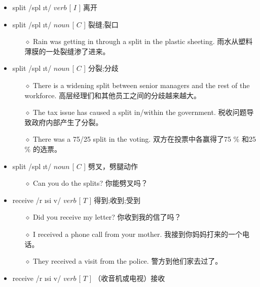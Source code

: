 \documentclass[a4paper,top=2.5cm,buttom=2.5cm10.5pt]{book}
\begin{document}
\begin{itemize}
\item split /spl \i t/ $ verb $ [  $ I $  ] 离开
\end{itemize}
\begin{itemize}
\item split /spl \i t/ $ noun $ [  $ C $  ] 裂缝;裂口
\begin{itemize}
\item[$\diamond$] Rain was getting in through a split in the plastic sheeting.
雨水从塑料薄膜的一处裂缝渗了进来。
\end{itemize}
\end{itemize}
\begin{itemize}
\item split /spl \i t/ $ noun $ [  $ C $  ] 分裂;分歧
\begin{itemize}
\item[$\diamond$] There is a widening split between senior managers and the rest of the workforce.
高层经理们和其他员工之间的分歧越来越大。
\item[$\diamond$] The tax issue has caused a split in/within the government.
税收问题导致政府内部产生了分裂。
\item[$\diamond$] There was a 75/25 split in the voting.
双方在投票中各赢得了75 $ \% $ 和25 $ \% $ 的选票。
\end{itemize}
\end{itemize}
\begin{itemize}
\item split /spl \i t/ $ noun $ [  $ C $  ] 劈叉，劈腿动作
\begin{itemize}
\item[$\diamond$] Can you do the splits?
你能劈叉吗？
\end{itemize}
\end{itemize}
\begin{itemize}
\item receive /r \i  \textprimstress si \textlengthmark v/ $ verb $ [  $ T $  ] 得到;收到;受到
\begin{itemize}
\item[$\diamond$] Did you receive my letter?
你收到我的信了吗？
\item[$\diamond$] I received a phone call from your mother.
我接到你妈妈打来的一个电话。
\item[$\diamond$] They received a visit from the police.
警方到他们家去过了。
\end{itemize}
\end{itemize}
\begin{itemize}
\item receive /r \i  \textprimstress si \textlengthmark v/ $ verb $ [  $ T $  ] （收音机或电视）接收
\end{itemize}
\end{document}
